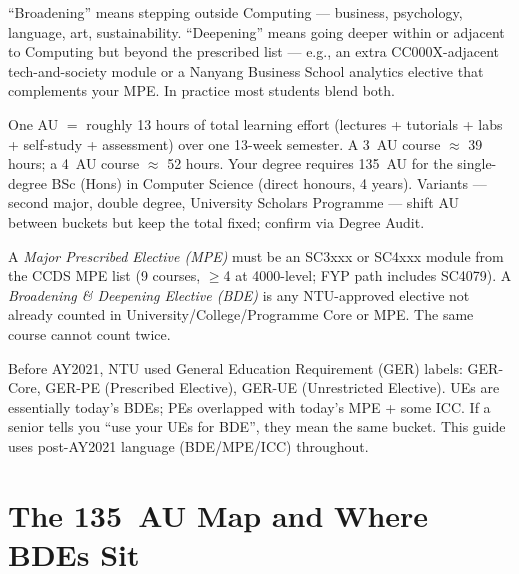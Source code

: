``Broadening'' means stepping outside Computing --- business, psychology, language, art, sustainability. ``Deepening'' means going deeper within or adjacent to Computing but beyond the prescribed list --- e.g., an extra CC000X-adjacent tech-and-society module or a Nanyang Business School analytics elective that complements your MPE. In practice most students blend both.

\begin{definition}
One AU $=$ roughly 13 hours of total learning effort (lectures + tutorials + labs + self-study + assessment) over one 13-week semester. A 3~AU course $\approx$ 39 hours; a 4~AU course $\approx$ 52 hours. Your degree requires 135~AU for the single-degree BSc (Hons) in Computer Science (direct honours, 4 years). Variants --- second major, double degree, University Scholars Programme --- shift AU between buckets but keep the total fixed; confirm via Degree Audit.
\end{definition}

\begin{definition}
A \emph{Major Prescribed Elective (MPE)} must be an SC3xxx or SC4xxx module from the CCDS MPE list (9 courses, $\ge$4 at 4000-level; FYP path includes SC4079). A \emph{Broadening \& Deepening Elective (BDE)} is any NTU-approved elective not already counted in University/College/Programme Core or MPE. The same course cannot count twice.
\end{definition}

\begin{remark}
Before AY2021, NTU used General Education Requirement (GER) labels: GER-Core, GER-PE (Prescribed Elective), GER-UE (Unrestricted Elective). UEs are essentially today's BDEs; PEs overlapped with today's MPE + some ICC. If a senior tells you ``use your UEs for BDE'', they mean the same bucket. This guide uses post-AY2021 language (BDE/MPE/ICC) throughout.
\end{remark}

\section{The 135~AU Map and Where BDEs Sit}
\label{sec:au-map}

